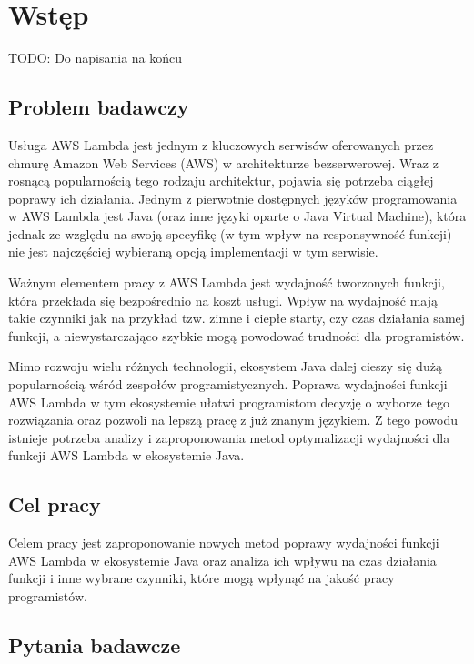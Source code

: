 \chapter*{Wstęp}\label{chapter:wstep}

TODO: Do napisania na końcu

\section*{Problem badawczy}\label{chapter:problem_badawczy}

Usługa AWS Lambda jest jednym z kluczowych serwisów oferowanych przez chmurę Amazon Web Services (AWS) w architekturze bezserwerowej. Wraz z rosnącą popularnością tego rodzaju architektur, pojawia się potrzeba ciągłej poprawy ich działania. Jednym z pierwotnie dostępnych języków programowania w AWS Lambda jest Java (oraz inne języki oparte o Java Virtual Machine), która jednak ze względu na swoją specyfikę (w tym wpływ na responsywność funkcji) nie jest najczęściej wybieraną opcją implementacji w tym serwisie.

Ważnym elementem pracy z AWS Lambda jest wydajność tworzonych funkcji, która przekłada się bezpośrednio na koszt usługi. Wpływ na wydajność mają takie czynniki jak na przykład tzw. zimne i ciepłe starty, czy czas działania samej funkcji, a niewystarczająco szybkie mogą powodować trudności dla programistów.

Mimo rozwoju wielu różnych technologii, ekosystem Java dalej cieszy się dużą popularnością wśród zespołów programistycznych. Poprawa wydajności funkcji AWS Lambda w tym ekosystemie ułatwi programistom decyzję o wyborze tego rozwiązania oraz pozwoli na lepszą pracę z już znanym językiem. Z tego powodu istnieje potrzeba analizy i zaproponowania metod optymalizacji wydajności dla funkcji AWS Lambda w ekosystemie Java.

\section*{Cel pracy}\label{chapter:cel_pracy}

Celem pracy jest zaproponowanie nowych metod poprawy wydajności funkcji AWS Lambda w ekosystemie Java oraz analiza ich wpływu na czas działania funkcji i inne wybrane czynniki, które mogą wpłynąć na jakość pracy programistów. 

\section*{Pytania badawcze}\label{chapter:pytania_badawcze}

